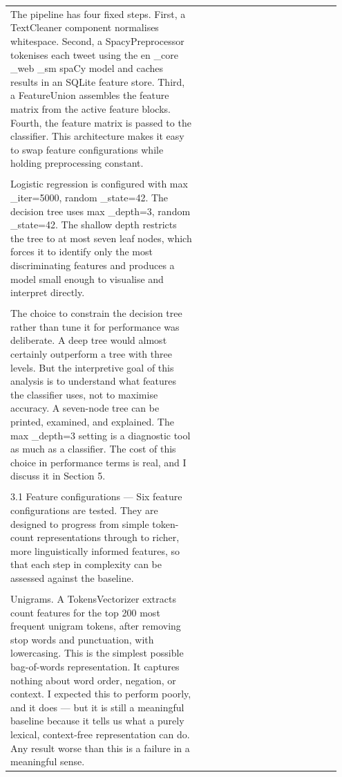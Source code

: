 \documentclass[11pt]{article}
\begin{document}
\begin{longtable}{|p{0.55\linewidth}|p{0.40\linewidth}|}
\hline
\rule{0pt}{3.5cm} & \\
\hline
The pipeline has four fixed steps. First, a TextCleaner component normalises whitespace. Second, a SpacyPreprocessor tokenises each tweet using the en \_core \_web \_sm spaCy model and caches results in an SQLite feature store. Third, a FeatureUnion assembles the feature matrix from the active feature blocks. Fourth, the feature matrix is passed to the classifier. This architecture makes it easy to swap feature configurations while holding preprocessing constant. & \\[2pt]
\hline
\rule{0pt}{3.5cm} & \\
\hline
Logistic regression is configured with max \_iter=5000, random \_state=42. The decision tree uses max \_depth=3, random \_state=42. The shallow depth restricts the tree to at most seven leaf nodes, which forces it to identify only the most discriminating features and produces a model small enough to visualise and interpret directly. & \\[2pt]
\hline
\rule{0pt}{3.5cm} & \\
\hline
The choice to constrain the decision tree rather than tune it for performance was deliberate. A deep tree would almost certainly outperform a tree with three levels. But the interpretive goal of this analysis is to understand what features the classifier uses, not to maximise accuracy. A seven-node tree can be printed, examined, and explained. The max \_depth=3 setting is a diagnostic tool as much as a classifier. The cost of this choice in performance terms is real, and I discuss it in Section 5. & \\[2pt]
\hline
\rule{0pt}{3.5cm} & \\
\hline
3.1 Feature configurations --- Six feature configurations are tested. They are designed to progress from simple token-count representations through to richer, more linguistically informed features, so that each step in complexity can be assessed against the baseline. & \\[2pt]
\hline
\rule{0pt}{3.5cm} & \\
\hline
Unigrams. A TokensVectorizer extracts count features for the top 200 most frequent unigram tokens, after removing stop words and punctuation, with lowercasing. This is the simplest possible bag-of-words representation. It captures nothing about word order, negation, or context. I expected this to perform poorly, and it does --- but it is still a meaningful baseline because it tells us what a purely lexical, context-free representation can do. Any result worse than this is a failure in a meaningful sense. & \\[2pt]

\end{longtable}
\end{document}
